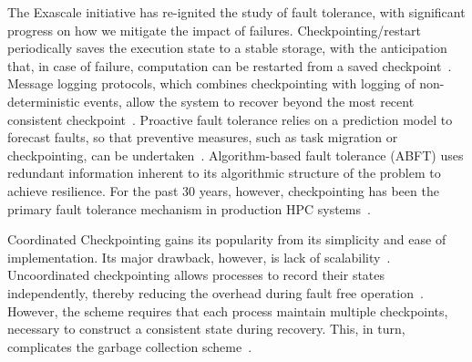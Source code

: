 
The Exascale initiative has re-ignited the study of fault tolerance, with significant progress on how we mitigate the impact of failures. 
Checkpointing/restart periodically saves the execution state to a stable storage, with the anticipation that, in case of failure, 
computation can be restarted from a saved checkpoint~\cite{Chandy:1985:DSD:214451.214456}. 
Message logging protocols, which combines checkpointing with logging of non-deterministic events, allow the system to recover beyond the most recent consistent checkpoint~\cite{Strom85optimisticrecovery}. Proactive fault tolerance relies on a prediction model to forecast faults, so that preventive measures, such as task migration or checkpointing, can be undertaken~\cite{gainaru2012fault}. Algorithm-based fault tolerance (ABFT) uses redundant information inherent to its algorithmic structure of the problem to achieve resilience. %
For the past 30 years, however, checkpointing has been the primary fault tolerance mechanism in 
production HPC systems~\cite{ferreira_sc_2011}. 

Coordinated Checkpointing gains its popularity from its simplicity and ease of implementation. Its major drawback, however, is lack of scalability~\cite{hargrove2006berkeley}.
Uncoordinated checkpointing allows processes to record their states independently, thereby reducing the overhead during fault free operation~\cite{guermouche_2011_ipdps}. 
However, the scheme requires that
each process maintain multiple checkpoints, necessary to construct a consistent state during recovery. This, in turn, complicates the garbage collection scheme~\cite{Elnozahy:02:Survey}. %


